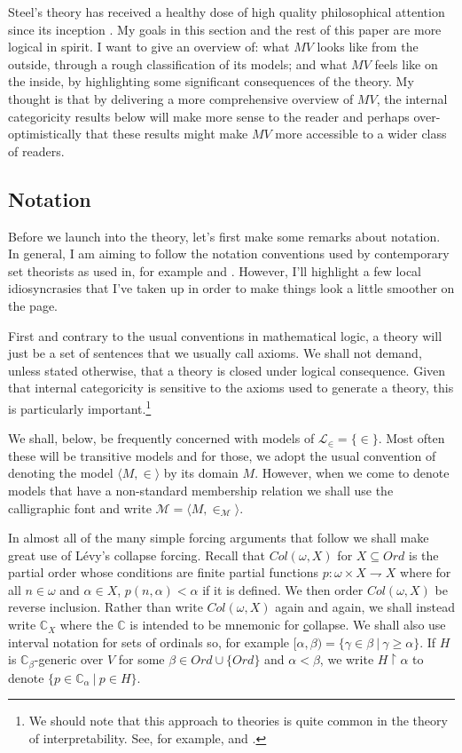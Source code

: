 \documentclass[10pt,a4paper]{amsart}
\numberwithin{equation}{section}
\numberwithin{figure}{section}
\theoremstyle{plain}
\theoremstyle{plain}
\theoremstyle{plain}
\theoremstyle{plain}
\theoremstyle{remark}
\theoremstyle{plain}
\theoremstyle{definition}
\begin{document}
Steel's theory has received a healthy dose of high quality philosophical
attention since its inception \citep{MeadMadPGMV,Meadows2Args,BAGARIA_TERNULLO_2023,BLUE_2024}.
My goals in this section and the rest of this paper are more logical
in spirit. I want to give an overview of: what $MV$ looks like from
the outside, through a rough classification of its models; and what
$MV$ feels like on the inside, by highlighting some significant consequences
of the theory. My thought is that by delivering a more comprehensive
overview of $MV$, the internal categoricity results below will make
more sense to the reader and perhaps over-optimistically that these
results might make $MV$ more accessible to a wider class of readers. 

\subsection{Notation}

Before we launch into the theory, let's first make some remarks about
notation. In general, I am aiming to follow the notation conventions
used by contemporary set theorists as used in, for example \citep{JechST,KunenST2}
and \citep{foreman2009handbook}. However, I'll highlight a few local
idiosyncrasies that I've taken up in order to make things look a little
smoother on the page. 

First and contrary to the usual conventions in mathematical logic,
a theory will just be a set of sentences that we usually call axioms.
We shall not demand, unless stated otherwise, that a theory is closed
under logical consequence. Given that internal categoricity is sensitive
to the axioms used to generate a theory, this is particularly important.\footnote{We should note that this approach to theories is quite common in the
theory of interpretability. See, for example, \citep{lindstrm2003aspects}
and \citep{EnayatLelykFOCat}.}

We shall, below, be frequently concerned with models of $\mathcal{L}_{\in}=\{\in\}$.
Most often these will be transitive models and for those, we adopt
the usual convention of denoting the model $\langle M,\in\rangle$
by its domain $M$. However, when we come to denote models that have
a non-standard membership relation we shall use the calligraphic font
and write $\mathcal{M}=\langle M,\in_{\mathcal{M}}\rangle$.

In almost all of the many simple forcing arguments that follow we
shall make great use of L\'{e}vy's collapse forcing. Recall that $Col(\omega,X)$
for $X\subseteq Ord$ is the partial order whose conditions are finite
partial functions $p:\omega\times X\rightharpoondown X$ where for
all $n\in\omega$ and $\alpha\in X$, $p(n,\alpha)<\alpha$ if it
is defined. We then order $Col(\omega,X)$ be reverse inclusion. Rather
than write $Col(\omega,X)$ again and again, we shall instead write
$\mathbb{C}_{X}$ where the $\mathbb{C}$ is intended to be mnemonic
for \uline{c}ollapse. We shall also use interval notation for sets
of ordinals so, for example $[\alpha,\beta)=\{\gamma\in\beta\ |\ \gamma\geq\alpha\}$.
If $H$ is $\mathbb{C}_{\beta}$-generic over $V$ for some $\beta\in Ord\cup\{Ord\}$
and $\alpha<\beta$, we write $H\restriction\alpha$ to denote $\{p\in\mathbb{C}_{\alpha}\ |\ p\in H\}$. 
\end{document}
